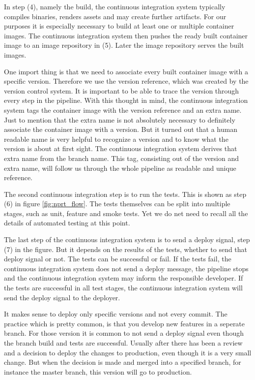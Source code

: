 In step (4), namely the build, the continuous integration system typically compiles
binaries, renders assets and may create further artifacts. For our purposes it is
especially necessary to build at least one or multiple container images. The continuous
integration system then pushes the ready built container image to an image repository in
(5). Later the image repository serves the built images.

One import thing is that we need to associate every built container image with a specific
version. Therefore we use the version reference, which was created by the version control
system. It is important to be able to trace the version through every step in the
pipeline. With this thought in mind, the continuous integration system tags the container
image with the version reference and an extra name. Just to mention that the extra name is
not absolutely necessary to definitely associate the container image with a version. But
it turned out that a human readable name is very helpful to recognize a version and to
know what the version is about at first sight. The continuous integration system derives
that extra name from the branch name. This tag, consisting out of the version and extra
name, will follow us through the whole pipeline as readable and unique reference.

The second continuous integration step is to run the tests. This is shown as step (6) in
figure \ref{fig:nprt_flow}. The tests themselves can be split into multiple stages, such
as unit, feature and smoke tests. Yet we do net need to recall all the details of
automated testing at this point.

The last step of the continuous integration system is to send a deploy signal, step (7) in
the figure. But it depends on the results of the tests, whether to send that deploy signal
or not. The tests can be successful or fail. If the tests fail, the continuous integration
system does not send a deploy message, the pipeline stops and the continuous integration
system may inform the responsible developer. If the tests are successful in all test
stages, the continuous integration system will send the deploy signal to the deployer.

It makes sense to deploy only specific versions and not every commit. The practice which
is pretty common, is that you develop new features in a seperate branch. For those version
it is common to not send a deploy signal even though the branch build and tests are
successful. Usually after there has been a review and a decision to deploy the changes to
production, even though it is a very small change. But when the decision is made and
merged into a specified branch, for instance the master branch, this version will go to
production.

